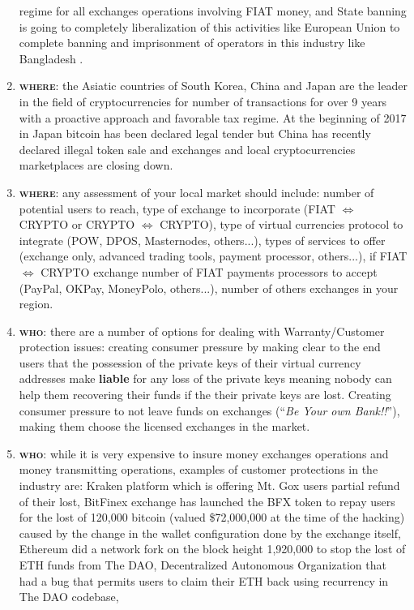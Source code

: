 \documentclass[11pt,fleqn]{book} %
\begin{document}
\begin{enumerate}
	regime for all exchanges operations involving FIAT money, and State banning is going to completely liberalization 
	of this activities like European Union to complete banning and imprisonment of operators in this industry like Bangladesh
	\cite{bitcoinLegality}. 
	\item \textbf{\textsc{where}}: the Asiatic countries of South Korea, China and Japan are the leader in the field of cryptocurrencies for number of 
	transactions for over 9 years with a proactive approach and favorable tax regime. At the beginning of 2017 in Japan bitcoin
	has been declared legal tender but China has recently declared illegal token sale and exchanges and local cryptocurrencies
	marketplaces are closing down.
	\item \textbf{\textsc{where}}: any assessment of your local market should include: number of potential users to reach, 
	type of exchange to incorporate (FIAT $\Leftrightarrow$ CRYPTO or CRYPTO $\Leftrightarrow$ CRYPTO), type of virtual currencies protocol 
	to integrate (POW, DPOS, Masternodes, others...), types of services to offer (exchange only, advanced trading tools,
	payment processor, others...), if FIAT $\Leftrightarrow$ CRYPTO exchange number of FIAT payments processors to accept (PayPal, OKPay,
	MoneyPolo, others...), number of others exchanges in your region.
	\item \textbf{\textsc{who}}: there are a number of options for dealing with Warranty/Customer protection issues: 
	creating consumer pressure by making clear to the end users that the possession of the private keys of their
	virtual currency addresses make \textbf{liable} for any loss of the private keys meaning nobody can help
	them recovering their funds if the their private keys are lost. Creating consumer pressure to not leave funds
	on exchanges (``\textit{Be Your own Bank!!}''), making them choose the licensed exchanges in the market. 
	\item \textbf{\textsc{who}}: while it is very expensive to insure money exchanges operations and money transmitting operations, 
	examples of customer protections in the industry are: Kraken platform which is offering Mt. Gox users partial refund
	of their lost, BitFinex exchange has launched the BFX token to repay users for the lost of 120,000 bitcoin 
	(valued \$72,000,000 at the time of the hacking) caused by the change in the wallet configuration done by the exchange
	itself, Ethereum did a network fork on the block height 1,920,000 to stop the lost of ETH funds from The DAO, Decentralized
	Autonomous Organization that had a bug that permits users to claim their ETH back using recurrency in The DAO codebase,

\end{enumerate}
\end{document}
